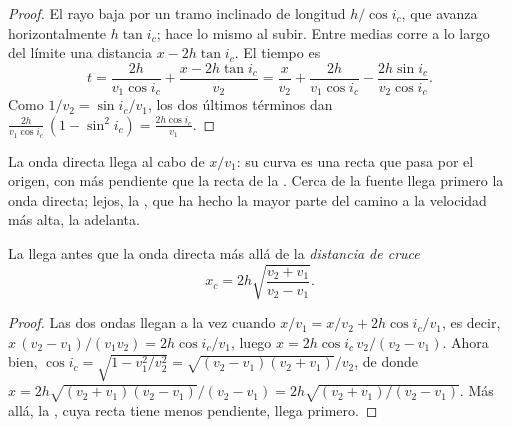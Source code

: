 \begin{proof}
El rayo baja por un tramo inclinado de longitud $h/\cos i_c$, que avanza
horizontalmente $h\tan i_c$; hace lo mismo al subir. Entre medias corre
a lo largo del límite una distancia $x - 2h\tan i_c$. El tiempo es
\[
  t = \frac{2h}{v_1\cos i_c} + \frac{x - 2h\tan i_c}{v_2}
    = \frac{x}{v_2} + \frac{2h}{v_1\cos i_c} - \frac{2h\sin i_c}{v_2\cos i_c}.
\]
Como $1/v_2 = \sin i_c/v_1$, los dos últimos términos dan
$\frac{2h}{v_1\cos i_c}\,(1 - \sin^2 i_c) = \frac{2h\cos i_c}{v_1}$.
\end{proof}

La onda directa llega al cabo de $x/v_1$: su curva es una recta que pasa por
el origen, con más pendiente que la recta de la . Cerca de la
fuente llega primero la onda directa; lejos, la , que ha hecho
la mayor parte del camino a la velocidad más alta, la adelanta.

\begin{proposition}\label{prop:g11:seismic-structure:crossover}
La  llega antes que la onda directa más allá de la
\emph{distancia de cruce}
\[
  x_c = 2h\sqrt{\frac{v_2 + v_1}{v_2 - v_1}}.
\]
\end{proposition}

\begin{proof}
Las dos ondas llegan a la vez cuando $x/v_1 = x/v_2 + 2h\cos i_c/v_1$, es decir,
$x\,(v_2 - v_1)/(v_1 v_2) = 2h\cos i_c/v_1$, luego $x = 2h\cos i_c\,v_2/(v_2 -
v_1)$. Ahora bien, $\cos i_c = \sqrt{1 - v_1^2/v_2^2} = \sqrt{(v_2 - v_1)(v_2 +
v_1)}/v_2$, de donde $x = 2h\sqrt{(v_2 + v_1)(v_2 - v_1)}/(v_2 - v_1) =
2h\sqrt{(v_2 + v_1)/(v_2 - v_1)}$. Más allá, la , cuya recta
tiene menos pendiente, llega primero.
\end{proof}


